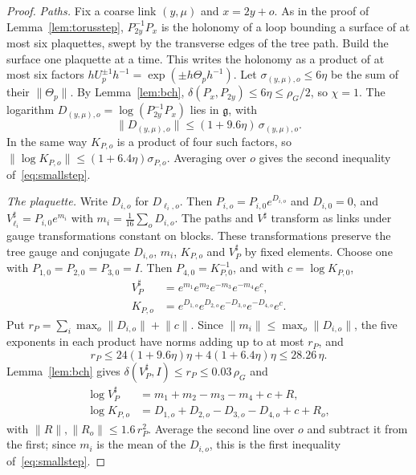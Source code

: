 \documentclass[11pt]{amsart}
\theoremstyle{definition}
\theoremstyle{remark}
\numberwithin{equation}{section}
\begin{document}
\begin{proof}
\emph{Paths.} Fix a coarse link $(y,\mu)$ and $x=2y+o$. As in the proof of
Lemma~\ref{lem:torusstep}, $P_{2y}^{-1}P_x$ is the holonomy of a loop
bounding a surface of at most six plaquettes, swept by the transverse edges
of the tree path. Build the surface one plaquette at a time. This writes
the holonomy as a product of at most six factors $hU_p^{\pm1}h^{-1}=
\exp(\pm h\Theta_ph^{-1})$. Let $\sigma_{(y,\mu),o}\le6\eta$ be the sum of
their $\lVert\Theta_p\rVert$. By Lemma~\ref{lem:bch}, $\delta(P_x,P_{2y})
\le6\eta\le\rho_G/2$, so $\chi=1$. The logarithm $D_{(y,\mu),o}=\log(
P_{2y}^{-1}P_x)$ lies in $\mathfrak g$, with
\[
\lVert D_{(y,\mu),o}\rVert\le(1+9.6\eta)\,\sigma_{(y,\mu),o}.
\]
In the same way $K_{P,o}$ is a product of four such factors, so
$\lVert\log K_{P,o}\rVert\le(1+6.4\eta)\sigma_{P,o}$. Averaging over $o$
gives the second inequality of~\eqref{eq:smallstep}.

\emph{The plaquette.} Write $D_{i,o}$ for $D_{\ell_i,o}$. Then $P_{i,o}=
P_{i,0}e^{D_{i,o}}$ and $D_{i,0}=0$, and $V^\sharp_{\ell_i}=P_{i,0}
e^{m_i}$ with $m_i=\frac1{16}\sum_oD_{i,o}$. The paths and $V^\sharp$
transform as links under gauge transformations constant on blocks. These
transformations preserve the tree gauge and conjugate $D_{i,o}$, $m_i$,
$K_{P,o}$ and $V^\sharp_P$ by fixed elements. Choose one with $P_{1,0}=
P_{2,0}=P_{3,0}=I$. Then $P_{4,0}=K_{P,0}^{-1}$, and with $c=\log
K_{P,0}$,
\begin{align*}
V^\sharp_P&=e^{m_1}e^{m_2}e^{-m_3}e^{-m_4}e^{c},\\
K_{P,o}&=e^{D_{1,o}}e^{D_{2,o}}e^{-D_{3,o}}e^{-D_{4,o}}e^{c}.
\end{align*}
Put $r_P=\sum_i\max_o\lVert D_{i,o}\rVert+\lVert c\rVert$. Since
$\lVert m_i\rVert\le\max_o\lVert D_{i,o}\rVert$, the five exponents in
each product have norms adding up to at most $r_P$, and
\[
r_P\le24(1+9.6\eta)\eta+4(1+6.4\eta)\eta\le28.26\,\eta .
\]
Lemma~\ref{lem:bch} gives $\delta(V^\sharp_P,I)\le r_P\le0.03\,\rho_G$ and
\begin{align*}
\log V^\sharp_P&=m_1+m_2-m_3-m_4+c+R,\\
\log K_{P,o}&=D_{1,o}+D_{2,o}-D_{3,o}-D_{4,o}+c+R_o,
\end{align*}
with $\lVert R\rVert,\lVert R_o\rVert\le1.6\,r_P^2$. Average the second
line over $o$ and subtract it from the first; since $m_i$ is the mean of
the $D_{i,o}$, this is the first inequality of~\eqref{eq:smallstep}.


\end{proof}
\end{document}
